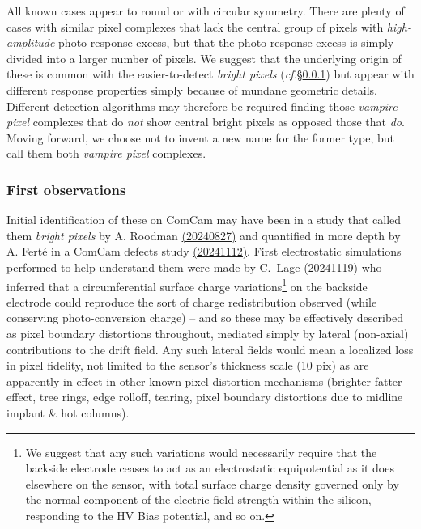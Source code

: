 All known cases appear to round or with circular symmetry. There are plenty of cases with similar pixel complexes that lack the central group of pixels with {\it high-amplitude} photo-response excess, but that the photo-response excess is simply divided into a larger number of pixels. We suggest that the underlying origin of these is common with the easier-to-detect {\it bright pixels} ({\it cf.}\S\ref{first-observations}) but appear with different response properties simply because of mundane geometric details. Different detection algorithms may therefore be required finding those {\it vampire pixel} complexes that do {\it not} show central bright pixels as opposed those that {\it do}. Moving forward, we choose not to invent a new name for the former type, but call them both {\it vampire pixel} complexes.

\subsubsection{First observations}\label{first-observations}

Initial identification of these on ComCam may have been in a study that called them {\it bright pixels} by A. Roodman \href{https://confluence.slac.stanford.edu/download/attachments/209355949/Bad%20Pixels%20and%20Bright%20Spots.pdf?version=1&modificationDate=1724769154615&api=v2}{(20240827)} and quantified in more depth by A. Fert\'e in a ComCam defects study \href{https://rubin-obs.slack.com/files/U07MZAE6V3P/F080JU4CH8A/isr_science_unit_meeting__11_12_2024_-_vampire_pixels.pdf}{(20241112)}. First electrostatic simulations performed to help understand them were made by C.~Lage \href{https://confluence.slac.stanford.edu/download/attachments/209355949/Vampire_Pixel_Simulations_18Nov24.pdf?version=1&modificationDate=1731964502136&api=v2}{(20241119)} who inferred that a circumferential surface charge variations\footnote{We suggest that any such variations would necessarily require that the backside electrode ceases to act as an electrostatic equipotential as it does elsewhere on the sensor, with total surface charge density governed only by the normal component of the electric field strength within the silicon, responding to the HV Bias potential, and so on.} 
on the backside electrode could reproduce the sort of charge redistribution observed (while conserving photo-conversion charge) -- and so these may be effectively described as pixel boundary distortions throughout, mediated simply by lateral (non-axial) contributions to the drift field. Any such lateral fields would mean a localized loss in pixel fidelity, not limited to the sensor's thickness scale (10 pix) as are apparently in effect in other known pixel distortion mechanisms (brighter-fatter effect, tree rings, edge rolloff, tearing, pixel boundary distortions due to midline implant \& hot columns).

